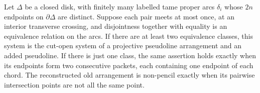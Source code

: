 \begin{proposition}\label{prop:disk-criterion}

Let $\Delta$ be a closed disk, with finitely many labelled tame proper
arcs $\delta_i$ whose $2n$ endpoints on $\partial\Delta$ are distinct.
Suppose each pair meets at most once, at an interior transverse
crossing, and disjointness together with equality is an equivalence
relation on the arcs.  If there are at least two equivalence classes,
this system is the cut-open system of a projective pseudoline
arrangement and an added pseudoline.  If there is just one class,
the same assertion holds exactly when its endpoints form two
consecutive packets, each containing one endpoint of each chord.
The reconstructed old arrangement is non-pencil exactly when its
pairwise intersection points are not all the same point.
\end{proposition}
